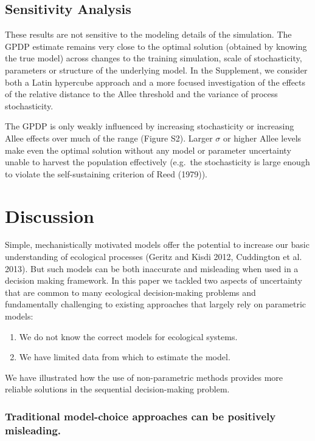 \documentclass[author-year, 12pt,review]{components/elsarticle} %
\begin{document}
\subsection{Sensitivity Analysis}\label{sensitivity-analysis}

These results are not sensitive to the modeling details of the
simulation. The GPDP estimate remains very close to the optimal solution
(obtained by knowing the true model) across changes to the training
simulation, scale of stochasticity, parameters or structure of the
underlying model. In the Supplement, we consider both a Latin hypercube
approach and a more focused investigation of the effects of the relative
distance to the Allee threshold and the variance of process
stochasticity.

The GPDP is only weakly influenced by increasing stochasticity or
increasing Allee effects over much of the range (Figure S2). Larger
$\sigma$ or higher Allee levels make even the optimal solution without
any model or parameter uncertainty unable to harvest the population
effectively (e.g.~the stochasticity is large enough to violate the
self-sustaining criterion of Reed (1979)).

\section{Discussion}\label{discussion}

Simple, mechanistically motivated models offer the potential to increase
our basic understanding of ecological processes (Geritz and Kisdi 2012,
Cuddington et al. 2013). But such models can be both inaccurate and
misleading when used in a decision making framework. In this paper we
tackled two aspects of uncertainty that are common to many ecological
decision-making problems and fundamentally challenging to existing
approaches that largely rely on parametric models:

\begin{enumerate}
\def\labelenumi{\arabic{enumi}.}
\itemsep1pt\parskip0pt
\item
  We do not know the correct models for ecological systems.
\item
  We have limited data from which to estimate the model.
\end{enumerate}

We have illustrated how the use of non-parametric methods provides more
reliable solutions in the sequential decision-making problem.

\subsubsection{Traditional model-choice approaches can be positively
misleading.}\label{traditional-model-choice-approaches-can-be-positively-misleading.}
\end{document}
